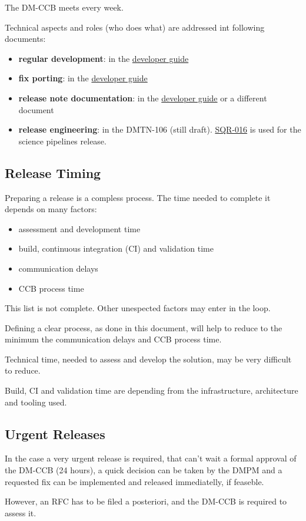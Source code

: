 The DM-CCB meets every week.

Technical aspects and roles (who does what) are addressed int following documents:

\begin{itemize}
\item {\bf regular development}: in the \href{https://developer.lsst.io/}{developer guide}
\item {\bf fix porting}: in the \href{https://developer.lsst.io/}{developer guide}
\item {\bf release note documentation}: in the \href{https://developer.lsst.io/}{developer guide} or a different document
\item {\bf release engineering}: in the DMTN-106 (still draft). \href{https://sqr-016.lsst.io/}{SQR-016} is used for the science pipelines release.
\end{itemize}


\subsection{Release Timing}

Preparing a release is a compless process.
The time needed to complete it depends on many factors:

\begin{itemize}
\item assessment and development time
\item build, continuous integration (CI) and validation time
\item communication delays
\item CCB process time
\end{itemize}

This list is not complete. Other unespected factors may enter in the loop.

Defining a clear process, as done in this document, will help to reduce to the minimum the communication delays and CCB process time.

Technical time, needed to assess and develop the solution, may be very difficult to reduce.

Build, CI and validation time are depending from the infrastructure, architecture and tooling used.


\subsection{Urgent Releases}

In the case a very urgent release is required, that can't wait a formal approval of the DM-CCB (24 hours),
a quick decision can be taken by the DMPM and a requested fix can be implemented and released immediatelly, if feaseble.

However, an RFC has to be filed a posteriori, and the DM-CCB is required to assess it.

